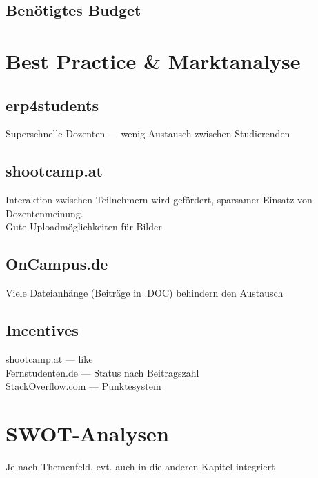 
\subsection{Benötigtes Budget} %
\label{sub:benotigtes_budget}



\section{Best Practice \& Marktanalyse} %
\label{sec:best_practice}

\subsection{erp4students} %
\label{sub:erp4students}
Superschnelle Dozenten --- wenig Austausch zwischen Studierenden

\subsection{shootcamp.at} %
\label{sub:shootcamp_at}
Interaktion zwischen Teilnehmern wird gefördert, sparsamer Einsatz von Dozentenmeinung.\\
Gute Uploadmöglichkeiten für Bilder

\subsection{OnCampus.de} %
\label{sub:oncampus_de}
Viele Dateianhänge (Beiträge in .DOC) behindern den Austausch

\subsection{Incentives} %
\label{sub:infentives}
shootcamp.at --- like\\
Fernstudenten.de --- Status nach Beitragszahl\\
StackOverflow.com --- Punktesystem


\section{SWOT-Analysen} %
\label{sec:swot_analysen}
Je nach  Themenfeld, evt. auch in die anderen Kapitel integriert
